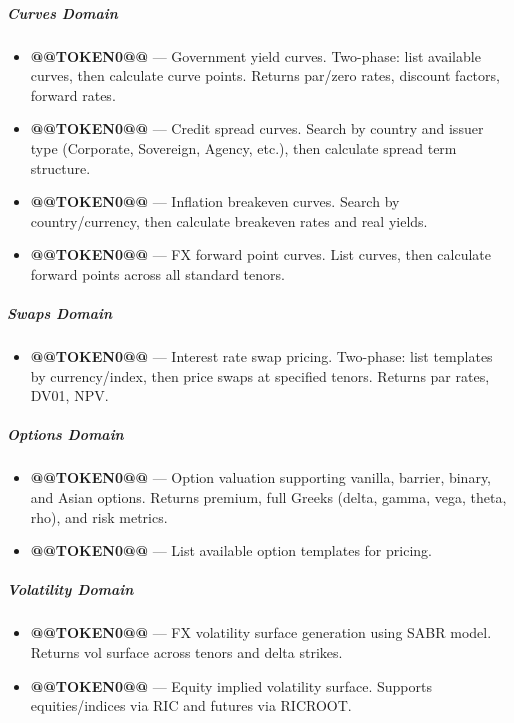 \documentclass[11pt]{article}
\begin{document}
\subparagraph{Curves Domain}\mbox{}\par
\begin{itemize}[leftmargin=*,itemsep=2pt,topsep=2pt]
\item {} \textbf{@@TOKEN0@@} — Government yield curves. Two-phase: list available curves, then calculate curve points. Returns par/zero rates, discount factors, forward rates.
\item {} \textbf{@@TOKEN0@@} — Credit spread curves. Search by country and issuer type (Corporate, Sovereign, Agency, etc.), then calculate spread term structure.
\item {} \textbf{@@TOKEN0@@} — Inflation breakeven curves. Search by country/currency, then calculate breakeven rates and real yields.
\item {} \textbf{@@TOKEN0@@} — FX forward point curves. List curves, then calculate forward points across all standard tenors.
\end{itemize}

\subparagraph{Swaps Domain}\mbox{}\par
\begin{itemize}[leftmargin=*,itemsep=2pt,topsep=2pt]
\item {} \textbf{@@TOKEN0@@} — Interest rate swap pricing. Two-phase: list templates by currency/index, then price swaps at specified tenors. Returns par rates, DV01, NPV.
\end{itemize}

\subparagraph{Options Domain}\mbox{}\par
\begin{itemize}[leftmargin=*,itemsep=2pt,topsep=2pt]
\item {} \textbf{@@TOKEN0@@} — Option valuation supporting vanilla, barrier, binary, and Asian options. Returns premium, full Greeks (delta, gamma, vega, theta, rho), and risk metrics.
\item {} \textbf{@@TOKEN0@@} — List available option templates for pricing.
\end{itemize}

\subparagraph{Volatility Domain}\mbox{}\par
\begin{itemize}[leftmargin=*,itemsep=2pt,topsep=2pt]
\item {} \textbf{@@TOKEN0@@} — FX volatility surface generation using SABR model. Returns vol surface across tenors and delta strikes.
\item {} \textbf{@@TOKEN0@@} — Equity implied volatility surface. Supports equities/indices via RIC and futures via RICROOT.
\end{itemize}
\end{document}
